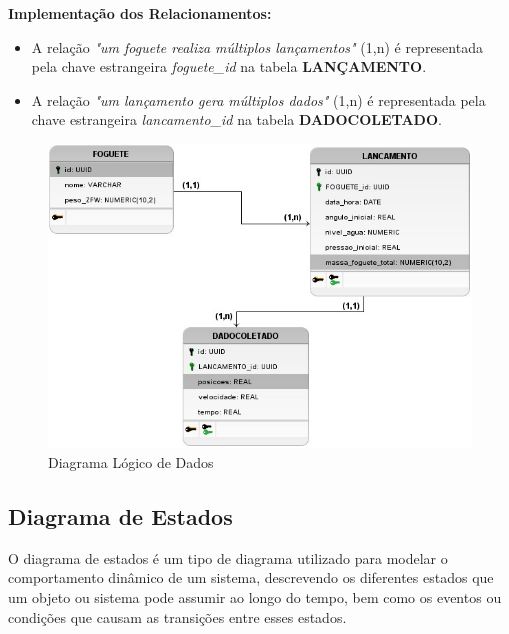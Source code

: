 \textbf{Implementação dos Relacionamentos:}
\begin{itemize}
  \item A relação \textit{"um foguete realiza múltiplos lançamentos"} (1,n) é representada pela chave estrangeira \textit{foguete\_id} na tabela \textbf{LANÇAMENTO}.

  \item A relação \textit{"um lançamento gera múltiplos dados"} (1,n) é representada pela chave estrangeira \textit{lancamento\_id} na tabela \textbf{DADOCOLETADO}.
\end{itemize}

\begin{figure}[H]
\centering
\includegraphics[width=1\linewidth]{editaveis/figuras/diagrama_LogicoDados.png}
\caption{Diagrama Lógico de Dados}
\label{fig:dld}
\end{figure}




\subsection{Diagrama de Estados}
O diagrama de estados é um tipo de diagrama utilizado para modelar o comportamento dinâmico de um sistema, descrevendo os diferentes estados que um objeto ou sistema pode assumir ao longo do tempo, bem como os eventos ou condições que causam as transições entre esses estados.

